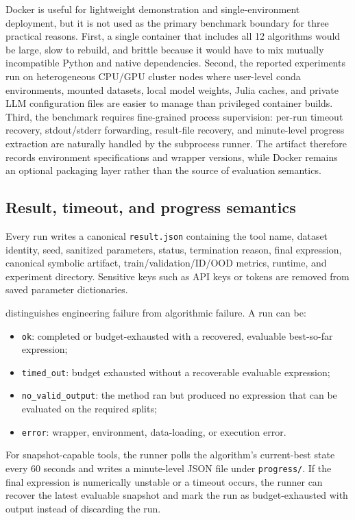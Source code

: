 Docker is useful for lightweight demonstration and single-environment deployment, but it is not used as the primary benchmark boundary for three practical reasons. First, a single container that includes all 12 algorithms would be large, slow to rebuild, and brittle because it would have to mix mutually incompatible Python and native dependencies. Second, the reported experiments run on heterogeneous CPU/GPU cluster nodes where user-level conda environments, mounted datasets, local model weights, Julia caches, and private LLM configuration files are easier to manage than privileged container builds. Third, the benchmark requires fine-grained process supervision: per-run timeout recovery, stdout/stderr forwarding, result-file recovery, and minute-level progress extraction are naturally handled by the subprocess runner. The artifact therefore records environment specifications and wrapper versions, while Docker remains an optional packaging layer rather than the source of evaluation semantics.

\subsection{Result, timeout, and progress semantics}

Every run writes a canonical \texttt{result.json} containing the tool name, dataset identity, seed, sanitized parameters, status, termination reason, final expression, canonical symbolic artifact, train/validation/ID/OOD metrics, runtime, and experiment directory. Sensitive keys such as API keys or tokens are removed from saved parameter dictionaries.

\arena{} distinguishes engineering failure from algorithmic failure. A run can be:
\begin{itemize}[leftmargin=*]
    \item \texttt{ok}: completed or budget-exhausted with a recovered, evaluable best-so-far expression;
    \item \texttt{timed\_out}: budget exhausted without a recoverable evaluable expression;
    \item \texttt{no\_valid\_output}: the method ran but produced no expression that can be evaluated on the required splits;
    \item \texttt{error}: wrapper, environment, data-loading, or execution error.
\end{itemize}
For snapshot-capable tools, the runner polls the algorithm's current-best state every 60 seconds and writes a minute-level JSON file under \texttt{progress/}. If the final expression is numerically unstable or a timeout occurs, the runner can recover the latest evaluable snapshot and mark the run as budget-exhausted with output instead of discarding the run.

